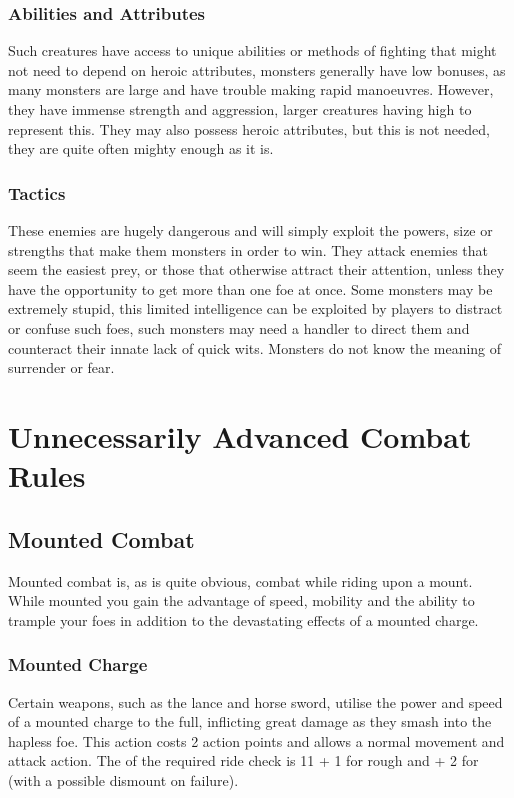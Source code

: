 \documentclass[a4paper,10pt,oneside]{book}
\newcommand{\textlf}[1]{\textbf{\titlecap{#1}}}
\begin{document}
\subsubsection{Abilities and Attributes}
Such creatures have access to unique abilities or methods of fighting that might not need to depend on heroic attributes, monsters generally have low \textlf{aim} bonuses, as many monsters are large and have trouble making rapid manoeuvres. However, they have immense strength and aggression, larger creatures having high \textlf{power} to represent this. They may also possess heroic attributes, but this is not needed, they are quite often mighty enough as it is. 
\subsubsection{Tactics}
These enemies are hugely dangerous and will simply exploit the powers, size or strengths that make them monsters in order to win. They attack enemies that seem the easiest prey, or those that otherwise attract their attention, unless they have the opportunity to get more than one foe at once. Some monsters may be extremely stupid, this limited intelligence can be exploited by players to distract or confuse such foes, such monsters may need a handler to direct them and counteract their innate lack of quick wits. Monsters do not know the meaning of surrender or fear.


\section{Unnecessarily Advanced Combat Rules}

\subsection{Mounted Combat}
\label{sec:mountandblade}
Mounted combat is, as is quite obvious, combat while riding upon a mount. While mounted you gain the advantage of speed, mobility and the ability to trample your foes in addition to the devastating effects of a mounted charge.

\subsubsection{Mounted Charge}
Certain weapons, such as the lance and horse sword, utilise the power and speed of a mounted charge to the full, inflicting great damage as they smash into the hapless foe. This action costs 2 action points and allows a normal movement and attack action. The \textlf{difficulty} of the required ride check is 11 + 1 for rough and + 2 for \textlf{dangerous terrain} (with a possible dismount on failure). 
\end{document}
